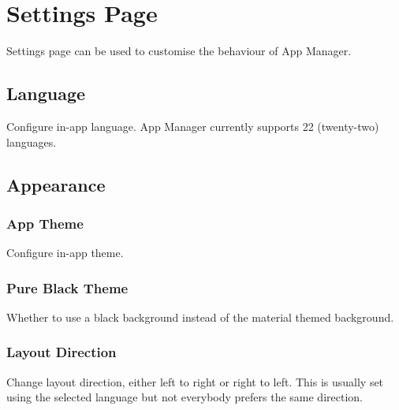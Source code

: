 \section{Settings Page}\label{sec:settings-page} %
Settings page can be used to customise the behaviour of App Manager.

\subsection{Language}\label{subsec:language} %
Configure in-app language. App Manager currently supports 22 (twenty-two) languages.

\subsection{Appearance}\label{subsec:appearance} %

\subsubsection{App Theme}\label{subsubsec:app-theme} %
Configure in-app theme.

\subsubsection{Pure Black Theme}\label{subsubsec:pure-black-theme} %
Whether to use a black background instead of the material themed background.

\subsubsection{Layout Direction}\label{subsubsec:layout-direction} %
Change layout direction, either left to right or right to left. This is usually set using the selected language but not
everybody prefers the same direction.

